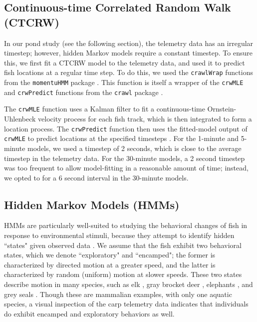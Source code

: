 \documentclass[12pt]{article}
\begin{document}
	\subsection{Continuous-time Correlated Random Walk (CTCRW)}
	
		In our pond study (see the following section), the telemetry data has an irregular timestep; however, hidden Markov models require a constant timestep. To ensure this, we first fit a CTCRW model to the telemetry data, and used it to predict fish locations at a regular time step. To do this, we used the \texttt{crawlWrap} functions from the \texttt{momentuHMM} package \cite{McClintock2018}. This function is itself a wrapper of the \texttt{crwMLE} and \texttt{crwPredict} functions from the \texttt{crawl} package \cite{crawl}. 
		
		The \texttt{crwMLE} function uses a Kalman filter to fit a continuous-time Ornstein-Uhlenbeck velocity process for each fish track, which is then integrated to form a location process. The \texttt{crwPredict} function then uses the fitted-model output of \texttt{crwMLE} to predict locations at the specified timesteps \cite{crawl, Johnson2008}. For the 1-minute and 5-minute models, we used a timestep of 2 seconds, which is close to the average timestep in the telemetry data. For the 30-minute models, a 2 second timestep was too frequent to allow model-fitting in a reasonable amount of time; instead, we opted to for a 6 second interval in the 30-minute models.

	\subsection{Hidden Markov Models (HMMs)}
	
		HMMs are particularly well-suited to studying the behavioral changes of fish in response to environmental stimuli, because they attempt to identify hidden ``states" given observed data \cite{Rabiner1989}. We assume that the fish exhibit two behavioral states, which we denote ``exploratory" and ``encamped"; the former is characterized by directed motion at a greater speed, and the latter is characterized by random (uniform) motion at slower speeds. These two states describe motion in many species, such as elk \cite{Morales2004, Fryxell2008}, gray brocket deer \cite{Grotta-Neto2019}, elephants \cite{Roever2014, Vogel2019}, and grey seals \cite{Breed2009}. Though these are mammalian examples, with only one aquatic species, a visual inspection of the carp telemetry data indicates that individuals do exhibit encamped and exploratory behaviors as well.
		
\end{document}
